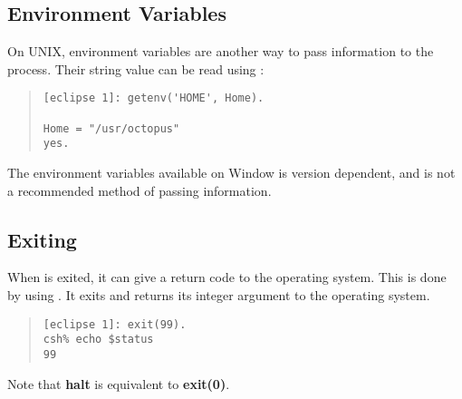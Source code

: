\subsection{Environment Variables}
On UNIX, environment variables are another way to pass information to the
{\eclipse} process. Their string value can be read using :
\begin{quote}\begin{verbatim}
[eclipse 1]: getenv('HOME', Home).

Home = "/usr/octopus"
yes.
\end{verbatim}\end{quote}

The environment variables available on Window is version dependent, and is
not a recommended method of passing information.

\subsection{Exiting {\eclipse}}
When {\eclipse} is exited, it can give a return code to the operating system.
This is done by using . It exits {\eclipse} and returns its integer
argument to the operating system.
\begin{quote}\begin{verbatim}
[eclipse 1]: exit(99).
csh% echo $status
99
\end{verbatim}\end{quote}
Note that {\bf halt} is equivalent to {\bf exit(0)}.

